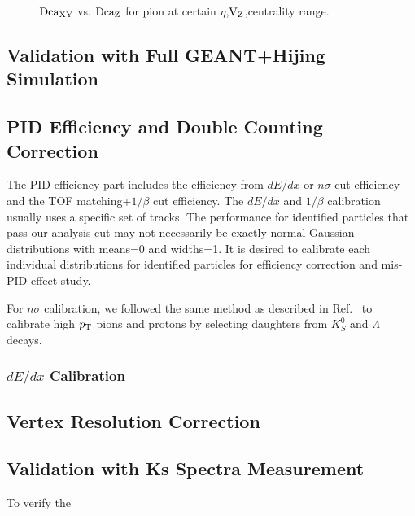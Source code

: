 \documentclass[a4paper]{article}
\begin{document}
\begin{figure}[htbp]
\begin{minipage}[htbp]{0.52\linewidth}
\caption{$\textup{Dca}_{\textup{XY}}$ vs. $\textup{Dca}_\textup{Z}$ for pion at certain $\eta$,$\textup{V}_{\textup{Z}}$,centrality range. \label{DcaExample}}
\end{minipage}
\end{figure}

\subsection{Validation with Full GEANT+Hijing Simulation}

\subsection{PID Efficiency and Double Counting Correction}

The PID efficiency part includes the efficiency from $dE/dx$ or $n\sigma$ cut efficiency and the TOF matching+$1/\beta$ cut efficiency. The $dE/dx$ and $1/\beta$ calibration usually uses a specific set of tracks. The performance for identified particles that pass our analysis cut may not necessarily be exactly normal Gaussian distributions with means=0 and widths=1. It is desired to calibrate each individual distributions for identified particles for efficiency correction and mis-PID effect study.

For $n\sigma$ calibration, we followed the same method as described in Ref.~\cite{Xu:2008th} to calibrate high $p_{\rm T}$ pions and protons by selecting daughters from $K_{S}^0$ and $\Lambda$ decays.

\subsubsection{$dE/dx$ Calibration}

\subsection{Vertex Resolution Correction}

\subsection{Validation with Ks Spectra Measurement}

To verify the 
\end{document}
